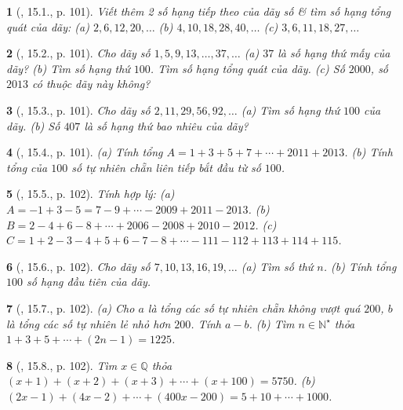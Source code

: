 \documentclass{article}
\newtheorem{baitoan}{}
\begin{document}
\begin{baitoan}[\cite{TLCT_THCS_Toan_6_so_hoc}, 15.1., p. 101]
	Viết thêm 2 số hạng tiếp theo của dãy số \& tìm số hạng tổng quát của dãy: (a) $2,6,12,20,\ldots$ (b) $4,10,18,28,40,\ldots$ (c) $3,6,11,18,27,\ldots$
\end{baitoan}

\begin{baitoan}[\cite{TLCT_THCS_Toan_6_so_hoc}, 15.2., p. 101]
	Cho dãy số $1,5,9,13,\ldots,37,\ldots$ (a) $37$ là số hạng thứ mấy của dãy? (b) Tìm số hạng thứ $100$. Tìm số hạng tổng quát của dãy. (c) Số $2000$, số $2013$ có thuộc dãy này không?
\end{baitoan}

\begin{baitoan}[\cite{TLCT_THCS_Toan_6_so_hoc}, 15.3., p. 101]
	Cho dãy số $2,11,29,56,92,\ldots$ (a) Tìm số hạng thứ $100$ của dãy. (b) Số $407$ là số hạng thứ bao nhiêu của dãy?
\end{baitoan}

\begin{baitoan}[\cite{TLCT_THCS_Toan_6_so_hoc}, 15.4., p. 101]
	(a) Tính tổng $A = 1 + 3 + 5 + 7 + \cdots + 2011 + 2013$. (b) Tính tổng của $100$ số tự nhiên chẵn liên tiếp bắt đầu từ số $100$.
\end{baitoan}

\begin{baitoan}[\cite{TLCT_THCS_Toan_6_so_hoc}, 15.5., p. 102]
	Tính hợp lý: (a) $A = -1 + 3 - 5 = 7 - 9 + \cdots - 2009 + 2011 - 2013$. (b) $B = 2 - 4 + 6 - 8 + \cdots + 2006 - 2008 + 2010 - 2012$. (c) $C = 1 + 2 - 3 - 4 + 5 + 6 - 7 - 8 + \cdots - 111 - 112 + 113 + 114 + 115$.
\end{baitoan}

\begin{baitoan}[\cite{TLCT_THCS_Toan_6_so_hoc}, 15.6., p. 102]
	Cho dãy số $7,10,13,16,19,\ldots$ (a) Tìm số thứ $n$. (b) Tính tổng $100$ số hạng đầu tiên của dãy.
\end{baitoan}

\begin{baitoan}[\cite{TLCT_THCS_Toan_6_so_hoc}, 15.7., p. 102]
	(a) Cho $a$ là tổng các số tự nhiên chẵn không vượt quá $200$, $b$ là tổng các số tự nhiên lẻ nhỏ hơn $200$. Tính $a - b$. (b) Tìm $n\in\mathbb{N}^\star$ thỏa $1 + 3 + 5 + \cdots + (2n - 1) = 1225$.
\end{baitoan}

\begin{baitoan}[\cite{TLCT_THCS_Toan_6_so_hoc}, 15.8., p. 102]
	Tìm $x\in\mathbb{Q}$ thỏa $(x + 1) + (x + 2) + (x + 3) + \cdots + (x + 100) = 5750$. (b) $(2x - 1) + (4x - 2) + \cdots + (400x - 200) = 5 + 10 + \cdots + 1000$.
\end{baitoan}
\end{document}
